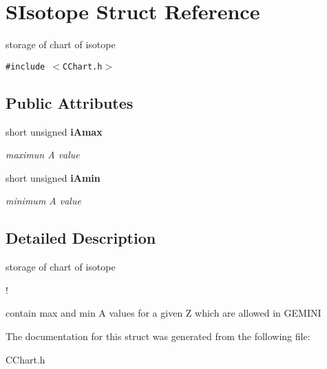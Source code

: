 \section{SIsotope Struct Reference}
\label{structSIsotope}
storage of chart of isotope  


{\tt \#include $<$CChart.h$>$}

\subsection*{Public Attributes}
\begin{CompactItemize}
\item 
short unsigned \bf{i\-Amax}\label{structSIsotope_6bb7dcddf5503eb0c655c28a5e28c846}

\begin{CompactList}\small\item\em maximun A value \item\end{CompactList}\item 
short unsigned \bf{i\-Amin}\label{structSIsotope_8f1b4142a80d46d639826b01fd350397}

\begin{CompactList}\small\item\em minimum A value \item\end{CompactList}\end{CompactItemize}


\subsection{Detailed Description}
storage of chart of isotope 

!

contain max and min A values for a given Z which are allowed in GEMINI 



The documentation for this struct was generated from the following file:\begin{CompactItemize}
\item 
CChart.h\end{CompactItemize}
